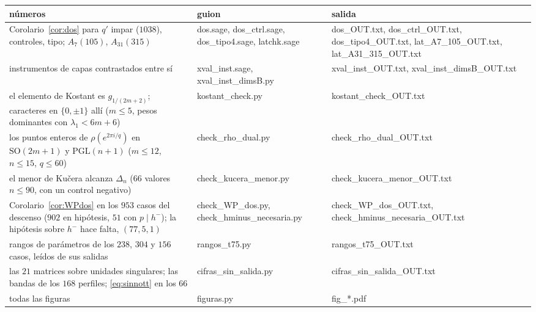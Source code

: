 \documentclass[11pt,a4paper]{article}
\theoremstyle{definition}
\begin{document}
\begin{center}\footnotesize
{}
\begin{tabular}{p{}p{}p{}}
\toprule
números & guion & salida \\
\midrule
Corolario~\ref{cor:dos} para $q'$ impar ($1038$), controles, tipo; $A_7(105)$, $A_{31}(315)$ & {\ttfamily\footnotesize dos.sage, dos\_ctrl.sage, dos\_tipo4.sage, latchk.sage} & {\ttfamily\footnotesize dos\_OUT.txt, \allowbreak dos\_ctrl\_OUT.txt, \allowbreak dos\_tipo4\_OUT.txt, \allowbreak lat\_A7\_105\_OUT.txt, \allowbreak lat\_A31\_315\_OUT.txt} \\
instrumentos de capas contrastados entre sí & {\ttfamily\footnotesize xval\_inst.sage, xval\_inst\_dimsB.py} & {\ttfamily\footnotesize xval\_inst\_OUT.txt, \allowbreak xval\_inst\_dimsB\_OUT.txt} \\
el elemento de Kostant es $g_{1/(2m+2)}$; caracteres en $\{0,\pm1\}$ allí ($m\le5$, pesos dominantes con $\lambda_1<6m+6$) & {\ttfamily\footnotesize kostant\_check.py} & {\ttfamily\footnotesize kostant\_check\_OUT.txt} \\
los puntos enteros de $\rho(e^{2\pi i/q})$ en $\mathrm{SO}(2m+1)$ y $\mathrm{PGL}(n+1)$ ($m\le12$, $n\le15$, $q\le60$) & {\ttfamily\footnotesize check\_rho\_dual.py} & {\ttfamily\footnotesize check\_rho\_dual\_OUT.txt} \\
el menor de Kučera alcanza $\Delta_n$ ($66$ valores $n\le90$, con un control negativo) & {\ttfamily\footnotesize check\_kucera\_menor.py} & {\ttfamily\footnotesize check\_kucera\_menor\_OUT.txt} \\
Corolario~\ref{cor:WPdos} en los $953$ casos del descenso ($902$ en hipótesis, $51$ con $p\mid h^-$); la hipótesis sobre $h^-$ hace falta, $(77,5,1)$ & {\ttfamily\footnotesize check\_WP\_dos.py, check\_hminus\_necesaria.py} & {\ttfamily\footnotesize check\_WP\_dos\_OUT.txt, \allowbreak check\_hminus\_necesaria\_OUT.txt} \\
rangos de parámetros de los $238$, $304$ y $156$ casos, leídos de sus salidas & {\ttfamily\footnotesize rangos\_t75.py} & {\ttfamily\footnotesize rangos\_t75\_OUT.txt} \\
las $21$ matrices sobre unidades singulares; las bandas de los $168$ perfiles; \eqref{eq:sinnott} en los $66$ & {\ttfamily\footnotesize cifras\_sin\_salida.py} & {\ttfamily\footnotesize cifras\_sin\_salida\_OUT.txt} \\
todas las figuras & {\ttfamily\footnotesize figuras.py} & {\ttfamily\footnotesize fig\_*.pdf} \\
\bottomrule
\end{tabular}
\end{center}
\end{document}
